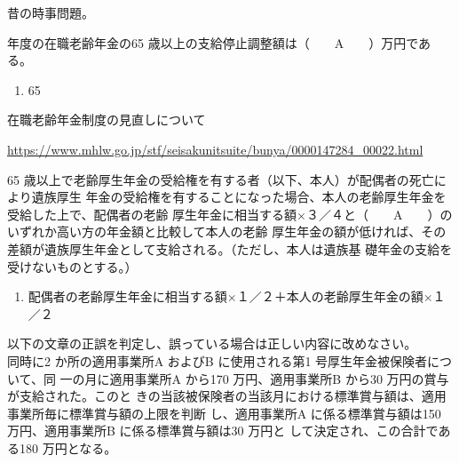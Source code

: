 \begin{explanationbox}
  昔の時事問題。
\end{explanationbox}

\begin{fillblank}[年金1 2019 問題1(5)\textcircled{4} 改題]
  \the\year 年度の在職老齢年金の65 歳以上の支給停止調整額は（　　A　　）万円である。
\end{fillblank}


\begin{answerbox}
  \begin{enumerate}[A: ]
    \item 65
  \end{enumerate}
\end{answerbox}


\begin{explanationbox}
在職老齢年金制度の見直しについて

  \url{https://www.mhlw.go.jp/stf/seisakunitsuite/bunya/0000147284_00022.html}
\end{explanationbox}

\begin{fillblank}[年金1 2019 問題1(5)\textcircled{6}]
  65 歳以上で老齢厚生年金の受給権を有する者（以下、本人）が配偶者の死亡により遺族厚生
年金の受給権を有することになった場合、本人の老齢厚生年金を受給した上で、配偶者の老齢
厚生年金に相当する額×３／４と（　　A　　）のいずれか高い方の年金額と比較して本人の老齢
厚生年金の額が低ければ、その差額が遺族厚生年金として支給される。（ただし、本人は遺族基
礎年金の支給を受けないものとする。）
\end{fillblank}


\begin{answerbox}
  \begin{enumerate}[A: ]
    \item 配偶者の老齢厚生年金に相当する額×１／２＋本人の老齢厚生年金の額×１／２
  \end{enumerate}
\end{answerbox}

\begin{truefalse}[年金1 2019 問題2(2)\textcircled{1}]
以下の文章の正誤を判定し、誤っている場合は正しい内容に改めなさい。\\

同時に2 か所の適用事業所A およびB に使用される第1 号厚生年金被保険者について、同
一の月に適用事業所A から170 万円、適用事業所B から30 万円の賞与が支給された。このと
きの当該被保険者の当該月における標準賞与額は、適用事業所毎に標準賞与額の上限を判断
し、適用事業所A に係る標準賞与額は150 万円、適用事業所B に係る標準賞与額は30 万円と
して決定され、この合計である180 万円となる。
\end{truefalse}


